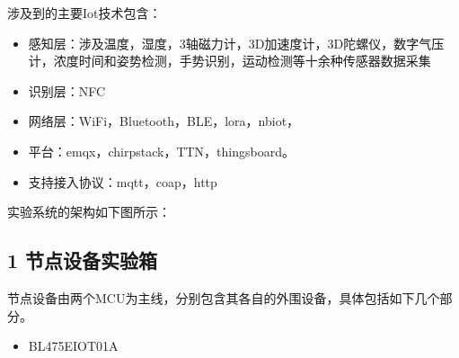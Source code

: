 \documentclass[a4paper,12pt,english]{sphinxmanual}
\begin{document}
\sphinxAtStartPar
涉及到的主要Iot技术包含：
\begin{itemize}
\item {} 
\sphinxAtStartPar
感知层：涉及温度，湿度，3轴磁力计，3D加速度计，3D陀螺仪，数字气压计，浓度时间和姿势检测，手势识别，运动检测等十余种传感器数据采集

\item {} 
\sphinxAtStartPar
识别层：NFC

\item {} 
\sphinxAtStartPar
网络层：WiFi，Bluetooth，BLE，lora，nb\sphinxhyphen{}iot，

\item {} 
\sphinxAtStartPar
平台：emqx，chirpstack，TTN，thingsboard。

\item {} 
\sphinxAtStartPar
支持接入协议：mqtt，coap，http

\end{itemize}

\sphinxAtStartPar
实验系统的架构如下图所示：

\sphinxAtStartPar
{}


\subsection{1  节点设备\sphinxhyphen{}实验箱}
\label{\detokenize{dev-board/arch:id2}}
\sphinxAtStartPar
节点设备由两个MCU为主线，分别包含其各自的外围设备，具体包括如下几个部分。
\begin{itemize}
\item {} 
\sphinxAtStartPar
B\sphinxhyphen{}L475E\sphinxhyphen{}IOT01A

\end{itemize}
\end{document}
